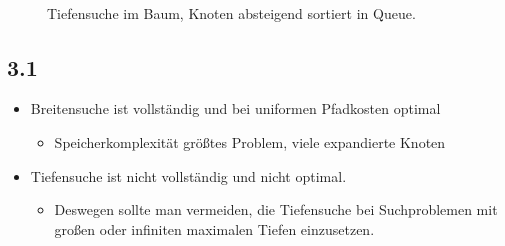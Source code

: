 \documentclass[10pt, a4paper]{article}
\begin{document}
\begin{figure}[htbp]
\begin{center}
        \\     
    \end{center}
    \caption{%
        Tiefensuche im Baum, Knoten absteigend sortiert in Queue.
     }%
\end{figure}

\subsection*{3.1}
\begin{itemize}
\item Breitensuche ist vollständig und bei uniformen Pfadkosten optimal
\begin{itemize}
\item Speicherkomplexität größtes Problem, viele expandierte Knoten
\end{itemize}

\item Tiefensuche ist nicht vollständig und nicht optimal.
\begin{itemize}
\item Deswegen sollte man vermeiden, die Tiefensuche bei Suchproblemen mit großen oder infiniten maximalen Tiefen einzusetzen.
\end{itemize}
\end{itemize}
\end{document}
